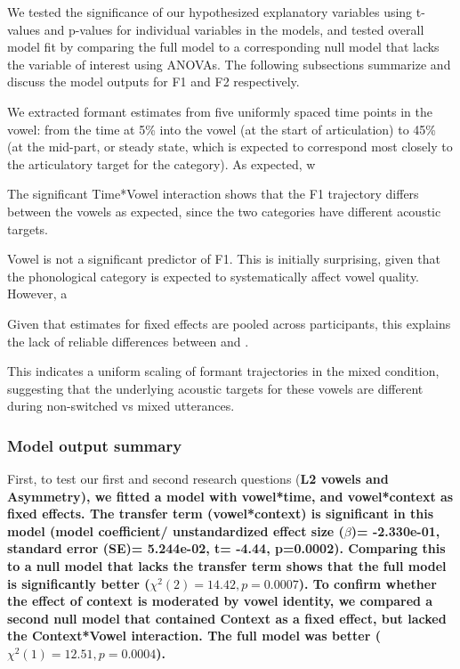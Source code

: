 We tested the significance of our hypothesized explanatory variables using t-values and p-values for individual variables in the models, and tested overall model fit by comparing the full model to a corresponding null model that lacks the variable of interest using ANOVAs. The following subsections summarize and discuss the model outputs for F1 and F2 respectively.


We extracted formant estimates from five uniformly spaced time points in the vowel: from the time at 5\% into the vowel (at the start of articulation) to 45\% (at the mid-part, or steady state, which is expected to correspond most closely to the articulatory target for the category). As expected, w


The significant Time*Vowel interaction shows that the F1 trajectory differs between the vowels as expected, since the two categories have different acoustic targets.  

Vowel is not a significant predictor of F1. This is initially surprising, given that the phonological category is expected to systematically affect vowel quality. However, a

Given that estimates for fixed effects are pooled across participants, this explains the lack of reliable differences between  and \nt{\ae}.

This indicates a uniform scaling of formant trajectories in the mixed condition, suggesting that the underlying acoustic targets for these vowels are different during non-switched vs mixed utterances. 



\subsubsection*{Model output summary}

First, to test our first and second research questions (\bf{L2 vowels and Asymmetry}), we fitted a model with vowel*time, and vowel*context as fixed effects. The transfer term (vowel*context) is significant in this model (model coefficient/ unstandardized effect size ($\beta$)= -2.330e-01, standard error (SE)=  5.244e-02, t= -4.44, p=0.0002). Comparing this to a null model that lacks the transfer term shows that the full model is significantly better ($\chi^2(2) = 14.42, p=  0.0007$). To confirm whether the effect of context is moderated by vowel identity, we compared a second null model that contained Context as a fixed effect, but lacked the Context*Vowel interaction. The full model was better ($\chi^2(1) = 12.51, p= 0.0004$).

